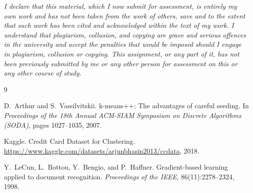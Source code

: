 \documentclass[11pt,a4paper]{article}
\begin{document}
\textit{I declare that this material, which I now submit for assessment,
is entirely my own work and has not been taken from the work of others, save
and to the extent that such work has been cited and acknowledged within the
text of my work. I understand that plagiarism, collusion, and copying are
grave and serious offences in the university and accept the penalties that
would be imposed should I engage in plagiarism, collusion or copying. This
assignment, or any part of it, has not been previously submitted by me or
any other person for assessment on this or any other course of study.}


\begin{thebibliography}{9}

D.~Arthur and S.~Vassilvitskii.
\newblock k-means++: The advantages of careful seeding.
\newblock In \textit{Proceedings of the 18th Annual ACM-SIAM Symposium on
Discrete Algorithms (SODA)}, pages 1027--1035, 2007.

{Kaggle}.
\newblock Credit Card Dataset for Clustering.
\newblock \url{https://www.kaggle.com/datasets/arjunbhasin2013/ccdata}, 2018.

Y.~LeCun, L.~Bottou, Y.~Bengio, and P.~Haffner.
\newblock Gradient-based learning applied to document recognition.
\newblock \textit{Proceedings of the IEEE}, 86(11):2278--2324, 1998.

\end{thebibliography}
\end{document}
